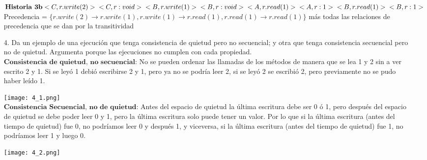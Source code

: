 \documentclass[12pt, letterpaper]{article}
\begin{document}
\begin{itemize}
$\textbf{Historia 3b}\\
<C, r.write(2)>\\
<C, r:void>\\
<B, r.write(1)>\\
<B, r:void>\\
<A, r.read(1)>\\
<A, r:1>\\
<B, r.read(1)>\\
<B, r:1>\\
$\\
Precedencia = $\{ r.write(2) \rightarrow r.write(1), r.write(1) \rightarrow r.read(1), r.read(1) \rightarrow r.read(1)\}$ más todas las relaciones de precedencia que se dan por la transitividad

\item[4. ] Da un ejemplo de una ejecución que tenga consistencia de quietud pero no secuencial; y otra que tenga consistencia secuencial pero no de quietud. Argumenta porque las ejecuciones no cumplen con cada propiedad.\\
$\textbf{Consistencia de quietud, no secuencial}$: No se pueden ordenar las llamadas de los métodos de manera que se lea 1 y 2 sin a ver escrito 2 y 1. Si se leyó 1 debió escribirse 2 y 1, pero ya no se podría leer 2, si se leyó 2 se escribió 2, pero previamente no se pudo haber leído 1.

\texttt{[image: 4\_1.png]}\\

$\textbf{Consistencia Secuencial, no de quietud}$: Antes del espacio de quietud la última escritura debe ser 0 ó 1, pero después del espacio de quietud se debe poder leer 0 y 1, pero la última escritura solo puede tener un valor. Por lo que si la última escritura (antes del tiempo de quietud) fue 0, no podríamos leer 0 y después 1, y viceversa, si la última escritura (antes del tiempo de quietud) fue 1, no podríamos leer 1 y luego 0.

\texttt{[image: 4\_2.png]}\\


\end{itemize}
\end{document}
